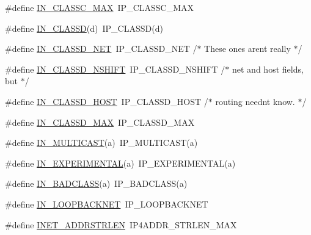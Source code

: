 \begin{DoxyCompactItemize}
\item 
\#define \hyperlink{openmote-cc2538_2lwip_2src_2include_2lwip_2inet_8h_acfb442312902f91f37a48045905f9d91}{I\+N\+\_\+\+C\+L\+A\+S\+S\+C\+\_\+\+M\+AX}~I\+P\+\_\+\+C\+L\+A\+S\+S\+C\+\_\+\+M\+AX
\item 
\#define \hyperlink{openmote-cc2538_2lwip_2src_2include_2lwip_2inet_8h_acb4f6667ca485b6f580d0f3b76097aec}{I\+N\+\_\+\+C\+L\+A\+S\+SD}(d)~I\+P\+\_\+\+C\+L\+A\+S\+SD(d)
\item 
\#define \hyperlink{openmote-cc2538_2lwip_2src_2include_2lwip_2inet_8h_a720505aad7a94c994bc6ee284231d68c}{I\+N\+\_\+\+C\+L\+A\+S\+S\+D\+\_\+\+N\+ET}~I\+P\+\_\+\+C\+L\+A\+S\+S\+D\+\_\+\+N\+ET     /$\ast$ These ones aren\textquotesingle{}t really $\ast$/
\item 
\#define \hyperlink{openmote-cc2538_2lwip_2src_2include_2lwip_2inet_8h_a2f8ed18d4a11ac9915e75811c6b42879}{I\+N\+\_\+\+C\+L\+A\+S\+S\+D\+\_\+\+N\+S\+H\+I\+FT}~I\+P\+\_\+\+C\+L\+A\+S\+S\+D\+\_\+\+N\+S\+H\+I\+FT  /$\ast$   net and host fields, but $\ast$/
\item 
\#define \hyperlink{openmote-cc2538_2lwip_2src_2include_2lwip_2inet_8h_a8fafe51d5e796049fa5d5a9dfaecdba5}{I\+N\+\_\+\+C\+L\+A\+S\+S\+D\+\_\+\+H\+O\+ST}~I\+P\+\_\+\+C\+L\+A\+S\+S\+D\+\_\+\+H\+O\+ST    /$\ast$   routing needn\textquotesingle{}t know. $\ast$/
\item 
\#define \hyperlink{openmote-cc2538_2lwip_2src_2include_2lwip_2inet_8h_aa0ac56dad56bb35e08a5cb1151f658a2}{I\+N\+\_\+\+C\+L\+A\+S\+S\+D\+\_\+\+M\+AX}~I\+P\+\_\+\+C\+L\+A\+S\+S\+D\+\_\+\+M\+AX
\item 
\#define \hyperlink{openmote-cc2538_2lwip_2src_2include_2lwip_2inet_8h_abcddcc195249a64bb13b5fc8b438548d}{I\+N\+\_\+\+M\+U\+L\+T\+I\+C\+A\+ST}(a)~I\+P\+\_\+\+M\+U\+L\+T\+I\+C\+A\+ST(a)
\item 
\#define \hyperlink{openmote-cc2538_2lwip_2src_2include_2lwip_2inet_8h_af168ec04d060a593fb5607320c90f06c}{I\+N\+\_\+\+E\+X\+P\+E\+R\+I\+M\+E\+N\+T\+AL}(a)~I\+P\+\_\+\+E\+X\+P\+E\+R\+I\+M\+E\+N\+T\+AL(a)
\item 
\#define \hyperlink{openmote-cc2538_2lwip_2src_2include_2lwip_2inet_8h_ad4485a652d68ab36f423d29d332d5482}{I\+N\+\_\+\+B\+A\+D\+C\+L\+A\+SS}(a)~I\+P\+\_\+\+B\+A\+D\+C\+L\+A\+SS(a)
\item 
\#define \hyperlink{openmote-cc2538_2lwip_2src_2include_2lwip_2inet_8h_a3d2d5e8347d77665a4aa3bd3ada19ff0}{I\+N\+\_\+\+L\+O\+O\+P\+B\+A\+C\+K\+N\+ET}~I\+P\+\_\+\+L\+O\+O\+P\+B\+A\+C\+K\+N\+ET
\item 
\#define \hyperlink{openmote-cc2538_2lwip_2src_2include_2lwip_2inet_8h_a93b37007689284fd9c4bde1a8f4b9199}{I\+N\+E\+T\+\_\+\+A\+D\+D\+R\+S\+T\+R\+L\+EN}~I\+P4\+A\+D\+D\+R\+\_\+\+S\+T\+R\+L\+E\+N\+\_\+\+M\+AX
\end{DoxyCompactItemize}
